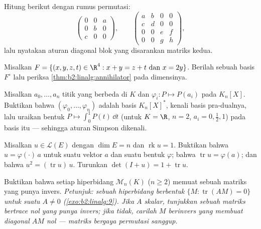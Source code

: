 \begin{exercise}[$\star$]\label{exo:b2:linalg:2}
Hitung  berikut dengan rumus permutasi:
\[
\begin{pmatrix} 0 & 0 & a\\ 0 & b & 0\\ c & 0 & 0 \end{pmatrix},
\qquad
\begin{pmatrix}
a & b & 0 & 0\\
c & d & 0 & 0\\
0 & 0 & e & f\\
0 & 0 & g & h
\end{pmatrix},
\]
lalu nyatakan aturan diagonal blok yang disarankan matriks kedua.
\end{exercise}

\begin{exercise}[$\star$]\label{exo:b2:linalg:3}
Misalkan $F = \{(x,y,z,t) \in \R^4 : x + y = z + t \text{ dan } x = 2y\}$.
Berilah sebuah basis $F^\circ$ lalu periksa
\cref{thm:b2:linalg:annihilator} pada dimensinya.
\end{exercise}

\begin{exercise}[$\star\star$]\label{exo:b2:linalg:4}
Misalkan $a_0, \dots, a_n$ titik yang berbeda di $K$ dan $\varphi_i \colon
P \mapsto P(a_i)$ pada $K_n[X]$. Buktikan bahwa $(\varphi_0, \dots,
\varphi_n)$ adalah basis $K_n[X]^*$, kenali basis pra-dualnya,
lalu uraikan bentuk $P \mapsto \int_0^1 P(t)\,\dd t$ (untuk $K = \R$,
$n = 2$, $a_i = 0, \frac12, 1$) pada basis itu --- sehingga aturan
Simpson dikenali.
\end{exercise}

\begin{exercise}[$\star\star$]\label{exo:b2:linalg:5}
Misalkan $u \in \mathcal{L}(E)$ dengan $\dim E = n$ dan $\operatorname{rk} u
= 1$. Buktikan bahwa $u = \varphi(\cdot)\, a$ untuk suatu vektor $a$ dan
suatu bentuk $\varphi$; bahwa $\operatorname{tr} u = \varphi(a)$; dan bahwa
$u^2 = (\operatorname{tr} u)\, u$. Turunkan $\det(I + u) = 1 +
\operatorname{tr} u$.
\end{exercise}

\begin{exercise}[$\star\star$]\label{exo:b2:linalg:6}
Buktikan bahwa setiap hiperbidang $\mathcal{M}_n(K)$ ($n \geq 2$)
memuat sebuah matriks yang punya invers. \emph{Petunjuk: sebuah
hiperbidang berbentuk $\{M : \operatorname{tr}(AM) = 0\}$ untuk suatu
$A \neq 0$ (\cref{exo:b2:linalg:9}). Jika $A$ skalar, tunjukkan sebuah
matriks bertrace nol yang punya invers; jika tidak, carilah $M$ berinvers
yang membuat diagonal $AM$ nol --- matriks bergaya permutasi sanggup.}
\end{exercise}

